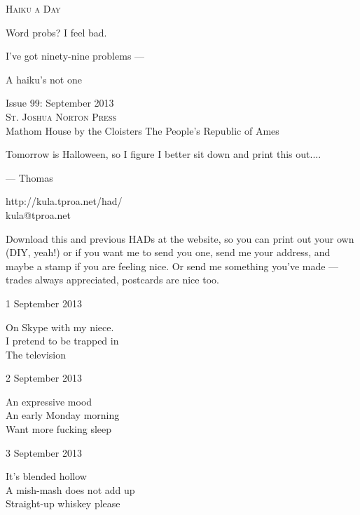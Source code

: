 \documentclass[12pt]{article}
\begin{document}
\begin{center}
{\fontsize{36}{48}\selectfont \textsc{Haiku a Day }}
\end{center}

\vspace*{3.5cm}

{\fontsize{20}{40}\selectfont 

Word probs? I feel bad.

I've got ninety-nine problems ---

A haiku's not one

}

\vspace*{5.0cm}
\begin{center}
{\large{Issue 99: September 2013}} \\[5mm]
{\fontsize{8}{8}\selectfont  \textsc{ St. Joshua Norton Press }} \\[1mm]
{\fontsize{6}{6}\selectfont Mathom House by the Cloisters \textbar The People's Republic of Ames }
\end{center}


\newpage

Tomorrow is Halloween, so I figure I better sit down and print this out....

--- Thomas

http://kula.tproa.net/had/ \\
kula@tproa.net

Download this and previous HADs at the website, so you can
print out your own (DIY, yeah!) or if you want me to send
you one, send me your address, and maybe a stamp if you
are feeling nice. Or send me something you've made ---
trades always appreciated, postcards are nice too.

\vfill

1 September 2013

On Skype with my niece. \\
I pretend to be trapped in \\
The television

2 September 2013

An expressive mood \\
An early Monday morning \\
Want more fucking sleep

\newpage

3 September 2013

It's blended hollow \\
A mish-mash does not add up \\
Straight-up whiskey please
\end{document}
